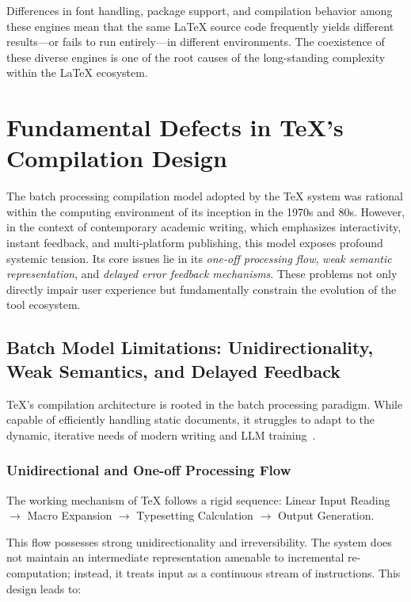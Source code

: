 Differences in font handling, package support, and compilation behavior among these engines mean that the same \LaTeX{} source code frequently yields different results---or fails to run entirely---in different environments. The coexistence of these diverse engines is one of the root causes of the long-standing complexity within the \LaTeX{} ecosystem.

\section{Fundamental Defects in \TeX{}'s Compilation Design}
\label{app:arch}
\label{sec:fundamental}

The batch processing compilation model adopted by the \TeX{} system was rational within the computing environment of its inception in the 1970s and 80s. However, in the context of contemporary academic writing, which emphasizes interactivity, instant feedback, and multi-platform publishing, this model exposes profound systemic tension. Its core issues lie in its \textit{one-off processing flow}, \textit{weak semantic representation}, and \textit{delayed error feedback mechanisms}. These problems not only directly impair user experience but fundamentally constrain the evolution of the tool ecosystem.

\subsection{Batch Model Limitations: Unidirectionality, Weak Semantics, and Delayed Feedback}

\TeX{}'s compilation architecture is rooted in the batch processing paradigm. While capable of efficiently handling static documents, it struggles to adapt to the dynamic, iterative needs of modern writing and LLM training~\cite{paster2023openwebmath}.

\subsubsection{Unidirectional and One-off Processing Flow}

The working mechanism of \TeX{} follows a rigid sequence: Linear Input Reading $\rightarrow$ Macro Expansion $\rightarrow$ Typesetting Calculation $\rightarrow$ Output Generation.

This flow possesses strong unidirectionality and irreversibility. The system does not maintain an intermediate representation amenable to incremental re-computation; instead, it treats input as a continuous stream of instructions. This design leads to:

